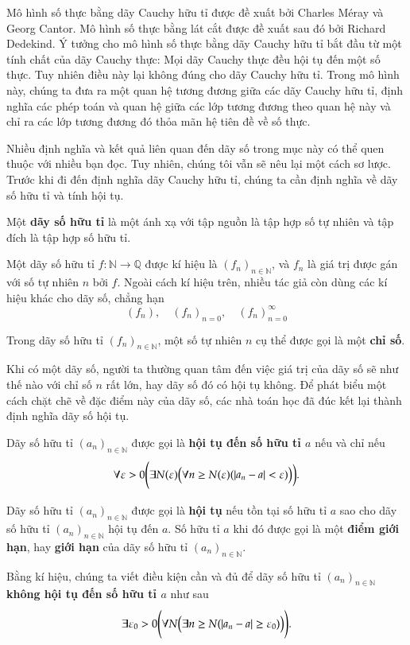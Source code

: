 Mô hình số thực bằng dãy Cauchy hữu tỉ được đề xuất bởi Charles M\'{e}ray và Georg Cantor. Mô hình số thực bằng lát cắt được đề xuất sau đó bởi Richard Dedekind. Ý tưởng cho mô hình số thực bằng dãy Cauchy hữu tỉ bắt đầu từ một tính chất của dãy Cauchy thực: Mọi dãy Cauchy thực đều hội tụ đến một số thực. Tuy nhiên điều này lại không đúng cho dãy Cauchy hữu tỉ. Trong mô hình này, chúng ta đưa ra một quan hệ tương đương giữa các dãy Cauchy hữu tỉ, định nghĩa các phép toán và quan hệ giữa các lớp tương đương theo quan hệ này và chỉ ra các lớp tương đương đó thỏa mãn hệ tiên đề về số thực.

Nhiều định nghĩa và kết quả liên quan đến dãy số trong mục này có thể quen thuộc với nhiều bạn đọc. Tuy nhiên, chúng tôi vẫn sẽ nêu lại một cách sơ lược. Trước khi đi đến định nghĩa dãy Cauchy hữu tỉ, chúng ta cần định nghĩa về dãy số hữu tỉ và tính hội tụ.

\begin{definition}
	Một \textbf{dãy số hữu tỉ} là một ánh xạ với tập nguồn là tập hợp số tự nhiên và tập đích là tập hợp số hữu tỉ.

	\noindent Một dãy số hữu tỉ $f: \mathbb{N}\to\mathbb{Q}$ được kí hiệu là ${(f_{n})}_{n\in\mathbb{N}}$, và $f_{n}$ là giá trị được gán với số tự nhiên $n$ bởi $f$. Ngoài cách kí hiệu trên, nhiều tác giả còn dùng các kí hiệu khác cho dãy số, chẳng hạn
	\[
		{(f_{n})}, \quad {(f_{n})}_{n=0}, \quad {(f_{n})}^{\infty}_{n=0}
	\]

	\noindent Trong dãy số hữu tỉ ${(f_{n})}_{n\in\mathbb{N}}$, một số tự nhiên $n$ cụ thể được gọi là một \textbf{chỉ số}.
\end{definition}

Khi có một dãy số, người ta thường quan tâm đến việc giá trị của dãy số sẽ như thế nào với chỉ số $n$ rất lớn, hay dãy số đó có hội tụ không. Để phát biểu một cách chặt chẽ về đặc điểm này của dãy số, các nhà toán học đã đúc kết lại thành định nghĩa dãy số hội tụ.

\begin{definition}
	Dãy số hữu tỉ ${(a_{n})}_{n\in\mathbb{N}}$ được gọi là
	\textbf{hội tụ đến số hữu tỉ $a$} nếu và chỉ nếu
	\[
		\forall \varepsilon > 0 \Biggl(\exists N(\varepsilon)\Bigl(\forall n\geq N(\varepsilon)(\left\vert{a_{n} - a}\right\vert < \varepsilon)\bigr)\biggr).
	\]

	Dãy số hữu tỉ ${(a_{n})}_{n\in\mathbb{N}}$ được gọi là \textbf{hội tụ} nếu tồn tại số hữu tỉ $a$ sao cho dãy số hữu tỉ ${(a_{n})}_{n\in\mathbb{N}}$ hội tụ đến $a$. Số hữu tỉ $a$ khi đó được gọi là một \textbf{điểm giới hạn}, hay \textbf{giới hạn} của dãy số hữu tỉ ${(a_{n})}_{n\in\mathbb{N}}$.

	Bằng kí hiệu, chúng ta viết điều kiện cần và đủ để dãy số hữu tỉ ${(a_{n})}_{n\in\mathbb{N}}$ \textbf{không hội tụ đến số hữu tỉ $a$} như sau
	\[
		\exists\varepsilon_{0} > 0 \Biggl(\forall N\Bigl(\exists n\geq N (\left\vert{a_{n} - a}\right\vert\geq\varepsilon_{0} )\Bigr)\Biggr).
	\]
\end{definition}

